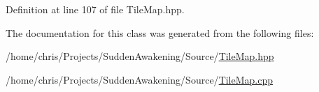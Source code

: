 Definition at line 107 of file Tile\-Map.\-hpp.



The documentation for this class was generated from the following files\-:\begin{DoxyCompactItemize}
\item 
/home/chris/\-Projects/\-Sudden\-Awakening/\-Source/\hyperlink{_tile_map_8hpp}{Tile\-Map.\-hpp}\item 
/home/chris/\-Projects/\-Sudden\-Awakening/\-Source/\hyperlink{_tile_map_8cpp}{Tile\-Map.\-cpp}\end{DoxyCompactItemize}
